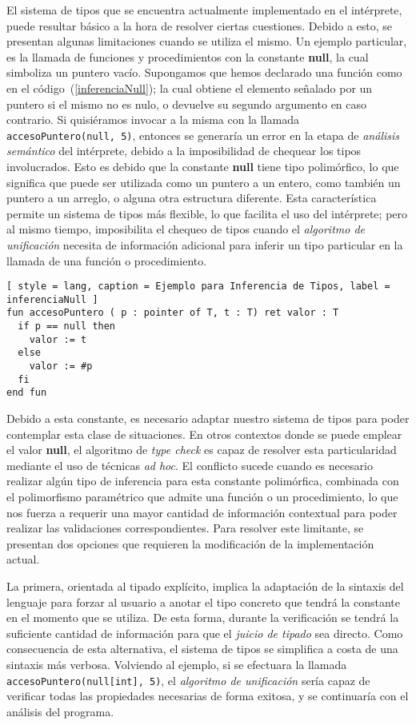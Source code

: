 El sistema de tipos que se encuentra actualmente implementado en el intérprete, puede resultar básico a la hora de resolver ciertas cuestiones.
Debido a esto, se presentan algunas limitaciones cuando se utiliza el mismo.
Un ejemplo particular, es la llamada de funciones y procedimientos con la constante \textbf{null}, la cual simboliza un puntero vacío.
Supongamos que hemos declarado una función como en el código~(\ref{inferenciaNull}); la cual obtiene el elemento señalado por un puntero si el mismo no es nulo, o devuelve su segundo argumento en caso contrario.
Si quisiéramos invocar a la misma con la llamada \lstinline[style = lang]{accesoPuntero(null, 5)}, entonces se generaría un error en la etapa de \textit{análisis semántico} del intérprete, debido a la imposibilidad de chequear los tipos involucrados.
Esto es debido que la constante \textbf{null} tiene tipo polimórfico, lo que significa que puede ser utilizada como un puntero a un entero, como también un puntero a un arreglo, o alguna otra estructura diferente.
Esta característica permite un sistema de tipos más flexible, lo que facilita el uso del intérprete; pero al mismo tiempo, imposibilita el chequeo de tipos cuando el \textit{algoritmo de unificación} necesita de información adicional para inferir un tipo particular en la llamada de una función o procedimiento.

\begin{lstlisting}[ style = lang, caption = Ejemplo para Inferencia de Tipos, label = inferenciaNull ]
fun accesoPuntero ( p : pointer of T, t : T) ret valor : T
  if p == null then
    valor := t
  else
    valor := #p
  fi
end fun
\end{lstlisting}

Debido a esta constante, es necesario adaptar nuestro sistema de tipos para poder contemplar esta clase de situaciones.
En otros contextos donde se puede emplear el valor \textbf{null}, el algoritmo de \textit{type check} es capaz de resolver esta particularidad mediante el uso de técnicas \textit{ad hoc}.
El conflicto sucede cuando es necesario realizar algún tipo de inferencia para esta constante polimórfica, combinada con el polimorfismo paramétrico que admite una función o un procedimiento, lo que nos fuerza a requerir una mayor cantidad de información contextual para poder realizar las validaciones correspondientes.
Para resolver este limitante, se presentan dos opciones que requieren la modificación de la implementación actual.

La primera, orientada al tipado explícito, implica la adaptación de la sintaxis del lenguaje para forzar al usuario a anotar el tipo concreto que tendrá la constante en el momento que se utiliza.
De esta forma, durante la verificación se tendrá la suficiente cantidad de información para que el \textit{juicio de tipado} sea directo.
Como consecuencia de esta alternativa, el sistema de tipos se simplifica a costa de una sintaxis más verbosa.
Volviendo al ejemplo, si se efectuara la llamada \lstinline[style = lang]{accesoPuntero(null[int], 5)}, el \textit{algoritmo de unificación} sería capaz de verificar todas las propiedades necesarias de forma exitosa, y se continuaría con el análisis del programa.

